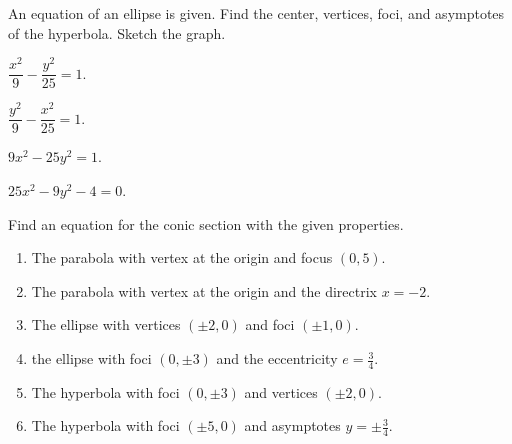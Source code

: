 \begin{exercise}
    An equation of an ellipse is given. Find the center, vertices, foci, and asymptotes of the hyperbola. Sketch the graph.\\
    \begin{enumerate*}
        \item $\dfrac{x^2}{9}-\dfrac{y^2}{25}=1$.
        \item $\dfrac{y^2}{9}-\dfrac{x^2}{25}=1$.
        \item $9x^2-25y^2=1$.
        \item $25x^2-9y^2-4=0$.
    \end{enumerate*}
\end{exercise}
\vspace*{10\baselineskip}

\begin{exercise}
Find an equation for 
the conic section with the given properties.
\begin{enumerate}
    \item The parabola with vertex at the origin and focus $(0, 5)$.
    \item The parabola with vertex at the origin and the directrix $x=-2$.
    \item The ellipse with vertices $(\pm 2, 0)$ and foci $(\pm 1, 0)$.
    \item the ellipse with foci $(0,\pm 3)$ and the eccentricity $e=\frac34$.
    \item The hyperbola with foci $(0,\pm 3)$ and vertices $(\pm 2, 0)$.
    \item The hyperbola with foci $(\pm 5, 0)$ and asymptotes $y=\pm\frac34$.
\end{enumerate}
\end{exercise}

